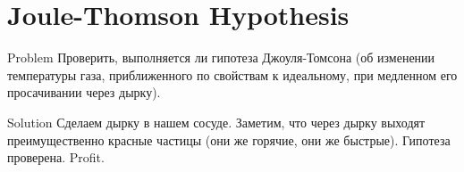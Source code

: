 \documentclass{beamer}
\begin{document}
\section{Joule-Thomson Hypothesis}

\begin{frame}[fragile]{Problem}
  Проверить, выполняется ли гипотеза Джоуля-Томсона (об изменении температуры газа, приближенного по
  свойствам к идеальному, при медленном его просачивании через дырку).
\end{frame}

\begin{frame}[fragile]{Solution}
  Сделаем дырку в нашем сосуде.
  \newline
  \newline
  \pause
  Заметим, что через дырку выходят преимущественно красные частицы (они же горячие, они же быстрые).
  \newline
  \newline
  \pause
  Гипотеза проверена. Profit.
\end{frame}
\end{document}
